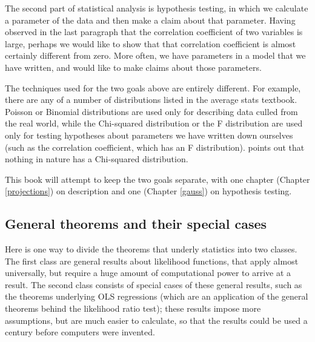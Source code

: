 \documentclass[12pt,notitlepage, openany]{book}
\begin{document}
\begin{multicols}{2}
The second part of statistical analysis is hypothesis testing, in which
we calculate a parameter of the data and then make a claim about that
parameter.  Having observed in the last paragraph that the correlation
coefficient of two variables is large, perhaps we would like to show
that that correlation coefficient is almost certainly different from
zero. More often, we have parameters in a model that we have written,
and would like to make claims about those parameters.

The techniques used for the two goals above are entirely different. For
example, there are any of a number of distributions listed in the
average stats textbook.  Poisson or Binomial distributions are used
only for describing data culled from the real world, while the Chi-squared
distribution or the F distribution are used only for testing hypotheses
about parameters we have written down ourselves (such as the correlation
coefficient, which has an F distribution). \cite{kmenta} points out that nothing
in nature has a Chi-squared distribution. 

This book will attempt to keep the two goals separate, with one chapter
(Chapter \ref{projections}) on description and one 
(Chapter \ref{gauss}) on hypothesis testing.

\subsection{General theorems and their special cases}
Here is one way to divide the theorems that underly
statistics into two classes. The first class are general
results about likelihood functions, that 
apply almost universally, but require a huge
amount of computational power to arrive at a result. The second class
consists of special cases of these general results, such as the theorems
underlying OLS regressions (which are an application of the general
theorems behind the likelihood ratio test); these results impose more
assumptions, but are much easier to calculate, so that the results could
be used a century before computers were invented.


\end{multicols}
\end{document}
